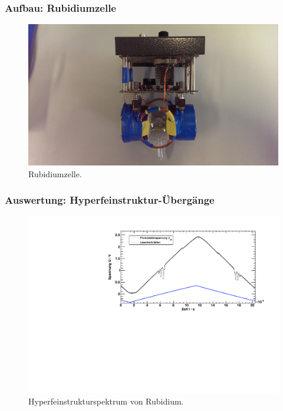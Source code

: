 \begin{frame}
\frametitle{Aufbau: Rubidiumzelle}
\begin{figure}[H]
    \centering
    \includegraphics[width=\textwidth]{../img/aufbau_rubidiumzelle.jpg}
    \caption{Rubidiumzelle.}
\end{figure}
\end{frame}

\begin{frame}
\frametitle{Auswertung: Hyperfeinstruktur-Übergänge}
\begin{figure}[H]
    \centering
    \includegraphics[width=\textwidth]{../img/down-hfs.pdf}
    \caption{Hyperfeinstrukturspektrum von Rubidium.}
\end{figure}
\end{frame}


